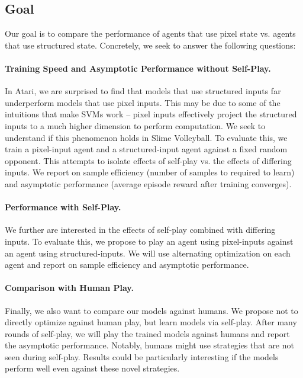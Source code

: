 \documentclass[10pt,twocolumn,letterpaper]{article}
\begin{document}
\subsection{Goal}

Our goal is to compare the performance of agents that use pixel state vs.
agents that use structured state. Concretely, we seek to answer the following
questions:

\paragraph{Training Speed and Asymptotic Performance without Self-Play.} In
Atari, we are surprised to find that models that use structured inputs far
underperform models that use pixel inputs. This may be due to some of the
intuitions that make SVMs work -- pixel inputs effectively project the
structured inputs to a much higher dimension to perform computation. We seek
to understand if this phenomenon holds in Slime Volleyball. To evaluate this,
we train a pixel-input agent and a structured-input agent against a
fixed random opponent. This attempts to isolate effects of self-play vs. the
effects of differing inputs. We report on sample efficiency (number of samples
to required to learn) and asymptotic performance (average episode reward after
training converges).

\paragraph{Performance with Self-Play.} We further are interested in the
effects of self-play combined with differing inputs. To evaluate this, we
propose to play an agent using pixel-inputs against an agent using
structured-inputs. We will use alternating optimization on each agent and
report on sample efficiency and asymptotic performance.

\paragraph{Comparison with Human Play.} Finally, we also want to compare our
models against humans. We propose not to directly optimize against human play,
but learn models via self-play. After many rounds of self-play, we will play
the trained models against humans and report the asymptotic performance.
Notably, humans might use strategies that are not seen during self-play.
Results could be particularly interesting if the models perform well even
against these novel strategies.
\end{document}
